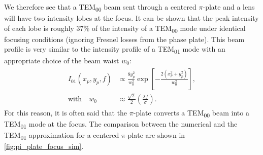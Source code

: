 We therefore see that a TEM\textsubscript{00} beam sent through a centered $\pi$-plate and a lens will have two intensity lobes at the focus. It can be shown that the peak intensity of each lobe is roughly 37\% of the intensity of a TEM\textsubscript{00} mode under identical focusing conditions (ignoring Fresnel losses from the phase plate). This beam profile is very similar to the intensity profile of a TEM\textsubscript{01} mode with an appropriate choice of the beam waist $w_0$:
\begin{align}
\label{eqn:TEM01_mode}
\begin{split}
I_{01}(x_p,y_p,f) &\propto \frac{8 y_p^2}{w_0^2} \exp\left[- \frac{2(x_p^2+y_p^2)}{w_0^2}\right], \\
\textrm{with} \quad w_0 &\approx \frac{\sqrt{2}}{2} \left( \frac{ \lambda f}{\sigma} \right).
\end{split}
\end{align}
For this reason, it is often said that the $\pi$-plate converts a TEM\textsubscript{00} beam into a TEM\textsubscript{01} mode at the focus. The comparison between the numerical and the TEM\textsubscript{01} approximation for a centered $\pi$-plate are shown in \cref{fig:pi_plate_focus_sim}.
